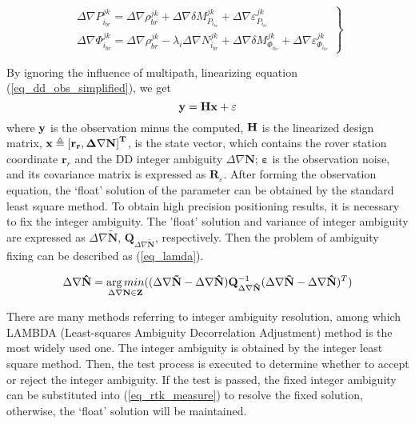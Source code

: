 \documentclass{svjour3}                     %
\begin{document}
\begin{figure*}
	\begin{equation}
	\left. \begin{array}{l}
	\Delta \nabla P_{{i_{br}}}^{jk} = \Delta \nabla \rho _{br}^{jk} + \Delta \nabla \delta M_{{P_{{i_{br}}}}}^{jk} + \Delta \nabla \varepsilon _{{P_{{i_{br}}}}}^{jk}\\
	\Delta \nabla \Phi _{{i_{br}}}^{jk} = \Delta \nabla \rho _{br}^{jk} - {\lambda _i}\Delta \nabla N_{{i_{br}}}^{jk} + \Delta \nabla \delta M_{{\Phi _{{i_{br}}}}}^{jk} + \Delta \nabla \varepsilon _{{\Phi _{{i_{br}}}}}^{jk}\end{array} \right\}
	\label{eq_dd_obs_simplified}
	\end{equation}
	
\end{figure*}
By ignoring the influence of multipath, linearizing equation (\ref{eq_dd_obs_simplified}), we get
\begin{equation}
\label{eq_rtk_measure}
{\bf{y}} = {\bf{Hx}} + {\bf{\varepsilon }}
\end{equation}
where $\bf{y}$ is the observation minus the computed,  $\bf{H} $ is the linearized design matrix\citep{hofmann-wellenhof2007gnss}, $\bf{x}\triangleq {{[{{\mathbf{r}}_{r}},\Delta \nabla \mathbf{N}]}^{T}}$, is the state vector, which contains the rover station coordinate ${{\mathbf{r}}_{r}}$ and the DD integer ambiguity $\Delta \nabla \mathbf{N}$;  $\mathbf{\varepsilon } $ is the observation noise, and its covariance matrix is expressed as  ${{\mathbf{R}}_{\varepsilon }} $. After forming the observation equation, the ‘float’ solution of the parameter can be obtained by the standard least square method. To obtain high precision positioning results, it is necessary to fix the integer ambiguity. The 'float' solution and variance of integer ambiguity are expressed as  $\Delta \nabla \mathbf{\tilde{N}} $,  ${{\mathbf{Q}}_{\Delta \nabla \mathbf{\tilde{N}}}} $, respectively. Then the problem of ambiguity fixing can be described as (\ref{eq_lamda})\citep{teunissen1995the}.
\begin{figure*}
	\begin{equation}
	\Delta \nabla {\bf{\hat N}} = \mathop {\arg min}\limits_{\Delta \nabla {\bf{N}} \in {\bf{Z}}} ((\Delta \nabla {\bf{\tilde N}} - \Delta \nabla {\bf{\hat N}}){\bf{Q}}_{\Delta \nabla {\bf{\tilde N}}}^{ - 1}{(\Delta \nabla {\bf{\tilde N}} - \Delta \nabla {\bf{\hat N}})^T})
	\label{eq_lamda}
	\end{equation}
\end{figure*}
There are many methods referring to integer ambiguity resolution, among which LAMBDA (Least-squares Ambiguity Decorrelation Adjustment)\citep{teunissen1995the} method is the most widely used one. The integer ambiguity is obtained by the integer least square method. Then, the test process is executed to determine whether to accept or reject the integer ambiguity. If the test is passed, the fixed integer ambiguity can be substituted into (\ref{eq_rtk_measure}) to resolve the fixed solution, otherwise, the ‘float’ solution will be maintained.
\end{document}
